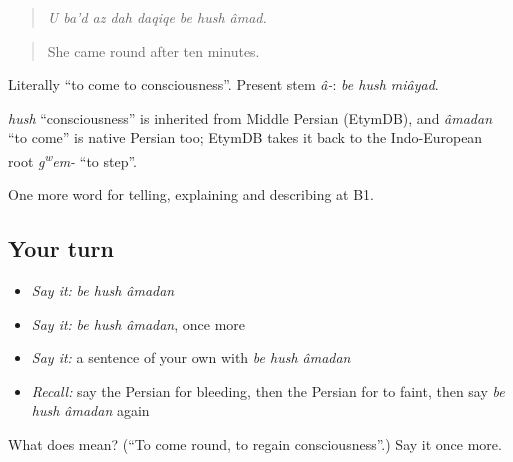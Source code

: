 \begin{quote}
\emph{U ba'd az dah daqiqe be hush âmad.}
\end{quote}

\begin{quote}
She came round after ten minutes.
\end{quote}

Literally \textquotedblleft{}to come to consciousness\textquotedblright{}. Present stem \emph{â-}: \emph{be hush miâyad}.

\begin{cousinweb}
\emph{hush} \textquotedblleft{}consciousness\textquotedblright{} is inherited from Middle Persian (EtymDB), and \emph{âmadan} \textquotedblleft{}to come\textquotedblright{} is native Persian too; EtymDB takes it back to the Indo-European root \emph{g\textsuperscript{w}em-} \textquotedblleft{}to step\textquotedblright{}.
\end{cousinweb}

\begin{grammarlens}[title={What you've built}]
One more word for telling, explaining and describing at B1.
\end{grammarlens}

\subsection*{Your turn}
\begin{itemize}
\raggedright
  \item \emph{Say it:} \emph{be hush âmadan}
  \item \emph{Say it:} \emph{be hush âmadan}, once more
  \item \emph{Say it:} a sentence of your own with \emph{be hush âmadan}
  \item \emph{Recall:} say the Persian for bleeding, then the Persian for to faint, then say \emph{be hush âmadan} again
\end{itemize}

\begin{tcolorbox}[breakable,colback=teal!4,colframe=teal!35!black,title={Before you move on}]
What does    mean? (\textquotedblleft{}To come round, to regain consciousness\textquotedblright{}.) Say it once more.
\end{tcolorbox}

